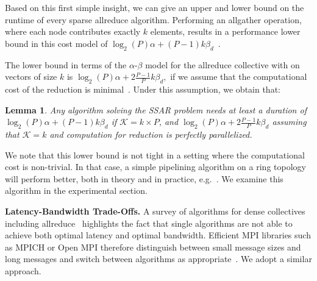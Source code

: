 \documentclass[11pt]{article}
\renewcommand{\paragraph}[1]{\vspace{0.1em} \noindent \textbf{#1}}
\newtheorem{lemma}[theorem]{Lemma}
\begin{document}

Based on this first simple insight, we can give an upper and lower bound
on the runtime of every sparse allreduce algorithm. Performing an
allgather operation, where each node contributes exactly $k$ elements,
results in a performance lower bound in this cost
model of 
$\log_2(P)\alpha + (P-1)k\beta_d$~\cite{chan2007collective}.

The lower bound in terms of the $\alpha$-$\beta$ model for the allreduce
collective with on vectors of size $k$
is
$\log_2(P)\alpha + 2\frac{P-1}{P}k\beta_d,$
if we assume that the computational cost of the reduction is
minimal~\cite{chan2007collective}. Under this assumption, we obtain that:
\begin{lemma}
	Any algorithm solving the SSAR problem needs at least a duration of $\log_2(P)\alpha + (P-1)k\beta_d$ if $\mathcal{K} = k \times P$, and $\log_2(P)\alpha + 2\frac{P-1}{P}k\beta_d$ assuming that $\mathcal{K} = k$ and computation for reduction is perfectly parallelized.
\end{lemma}

We note that this lower bound is not tight in a setting where the computational cost is non-trivial. 
In that case, a simple pipelining algorithm on a ring topology will perform better, both in theory and in practice, e.g.~\cite{hoefler-moor-collectives}. 
We examine this algorithm in the experimental section. 

\paragraph{Latency-Bandwidth Trade-Offs.} A survey of algorithms for
dense collectives including allreduce~\cite{hoefler-moor-collectives}
highlights the fact that single algorithms are not able to achieve both
optimal latency and optimal bandwidth.  Efficient MPI libraries such as
MPICH or Open MPI therefore distinguish between small message sizes and
long messages and switch between algorithms as
appropriate~\cite{thakur2003improving}. We adopt a similar approach. 
\end{document}
